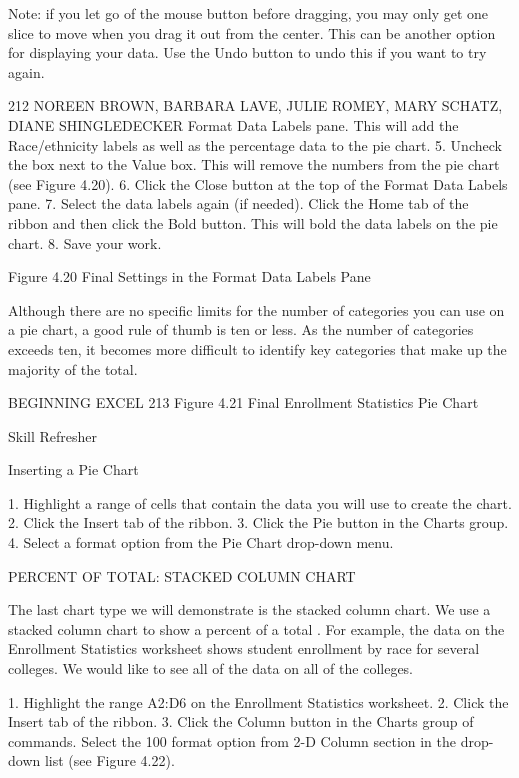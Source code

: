 Note: if you let go of the mouse button before dragging, you may only get one slice to move when you
drag it out from the center. This can be another option for displaying your data. Use the Undo button to
undo this if you want to try again.




212 NOREEN BROWN, BARBARA LAVE, JULIE ROMEY, MARY SCHATZ, DIANE SHINGLEDECKER
Format Data Labels pane. This will add the Race/ethnicity labels as well as the percentage data
to the pie chart.
5.   Uncheck the box next to the Value box. This will remove the numbers from the pie chart (see
Figure 4.20).
6.   Click the Close button at the top of the Format Data Labels pane.
7.   Select the data labels again (if needed). Click the Home tab of the ribbon and then click the Bold
button. This will bold the data labels on the pie chart.
8.   Save your work.




Figure 4.20 Final Settings in the Format Data Labels Pane


Although there are no specific limits for the number of categories you can use on a pie chart, a good
rule of thumb is ten or less. As the number of categories exceeds ten, it becomes more difficult to
identify key categories that make up the majority of the total.




BEGINNING EXCEL 213
Figure 4.21 Final Enrollment Statistics Pie Chart




Skill Refresher


Inserting a Pie Chart

1. Highlight a range of cells that contain the data you will use to create the chart.
2. Click the Insert tab of the ribbon.
3. Click the Pie button in the Charts group.
4. Select a format option from the Pie Chart drop-down menu.



PERCENT OF TOTAL: STACKED COLUMN CHART

The last chart type we will demonstrate is the stacked column chart. We use a stacked column chart to
show a percent of a total . For example, the data on the Enrollment Statistics worksheet shows student
enrollment by race for several colleges. We would like to see all of the data on all of the colleges.

1. Highlight the range A2:D6 on the Enrollment Statistics worksheet.
2. Click the Insert tab of the ribbon.
3. Click the Column button in the Charts group of commands. Select the 100%
format option from 2-D Column section in the drop-down list (see Figure 4.22).




